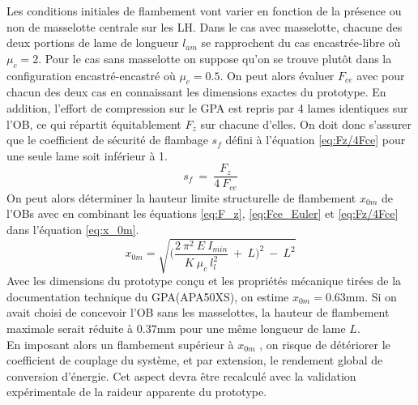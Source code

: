 Les conditions initiales de flambement vont varier en fonction de la présence ou non de masselotte centrale sur les LH. Dans le cas avec masselotte, chacune des deux portions de lame de longueur $l_{am}$ se rapprochent du cas encastrée-libre où $\mu_c=2$. Pour le cas sans masselotte on suppose qu'on se trouve plutôt dans la configuration encastré-encastré où $\mu_c=0.5$. On peut alors évaluer $F_{ce}$ avec pour chacun des deux cas en connaissant les dimensions exactes du prototype.
En addition, l'effort de compression sur le GPA est repris par 4 lames identiques sur l'OB, ce qui répartit équitablement $F_z$ sur chacune d'elles. On doit donc s'assurer que le coefficient de sécurité de flambage ${s_f}$ défini à l'équation \ref{eq:Fz/4Fce} pour une seule lame soit inférieur à 1.
\begin{equation}
		s_f\ =\ \dfrac{F_z}{4\ F_{ce}}
		\label{eq:Fz/4Fce}
\end{equation}
On peut alors déterminer la hauteur limite structurelle de flambement $x_{0m}$ de l'OBs avec en combinant les équations \ref{eq:F_z}, \ref{eq:Fce_Euler} et \ref{eq:Fz/4Fce} dans l'équation \ref{eq:x_0m}.
\begin{equation}
	x_{0m} =\sqrt{ \biggl(\frac{2\ \pi^2\ E\ I_{min}}{K\ \mu_c\ l_l^2}\ +\ L\biggr)^2\ -\ L^2}
	\label{eq:x_0m}
\end{equation}
Avec les dimensions du prototype conçu et les propriétés mécanique tirées de la documentation technique du GPA(APA50XS), on estime $x_{0m}=0.63$mm. Si on avait choisi de concevoir l'OB sans les masselottes, la hauteur de flambement maximale serait réduite à $0.37$mm pour une même longueur de lame $L$.\\
	En imposant alors un flambement supérieur à $x_{0m}$ , on risque de détériorer le coefficient de couplage du système, et par extension, le rendement global de conversion d'énergie. Cet aspect devra être recalculé avec la validation expérimentale de la raideur apparente du prototype.		
	
